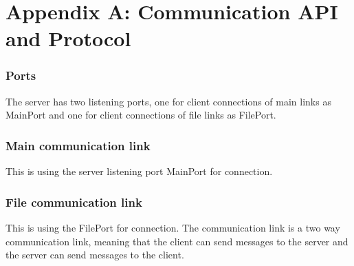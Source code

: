 \section{Appendix A: Communication API and Protocol}

\subsubsection{Ports}
The server has two listening ports, one for client connections of main links as MainPort and one for client connections of file links as FilePort.
 
\subsubsection{Main communication link}
This is using the server listening port MainPort for connection. 


\begin{table}
\begin{center}
\end{center}
\caption{Main communication link API messages.}
\label{tab-mainapi}
\end{table}

\subsubsection{File communication link}
This is using the FilePort for connection. The communication link is a two way communication link, meaning that the client can send messages to the server and the server can send messages to the client. 

